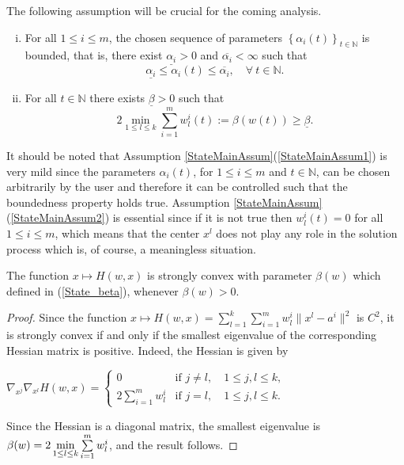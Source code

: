 The following assumption will be crucial for the coming analysis.
\begin{assumption}\label{StateMainAssum}
\begin{enumerate}[(i)] 
	\item For all $1 \leq i \leq m$, the chosen sequence of parameters $\left\lbrace \alpha_i(t) \right\rbrace_{t \in \mathbb{N}}$ is bounded, that is, there exist $\underline{\alpha_i} > 0$ and $\overline{\alpha_i} < \infty$ such that
		\begin{equation}
			\underline{\alpha_i} \leq \alpha_i(t) \leq \overline{\alpha_i}, \quad \forall \: t \in \mathbb{N}.
		\end{equation}		 \label{StateMainAssum1}
	\item For all $t \in \mathbb{N}$ there exists $\underline{\beta} > 0$ such that
		\begin{equation}
			2 \min\limits_{1 \leq l \leq k} \sum\limits_{i=1}^{m} w^i_l(t) := \beta(w(t)) \geq \underline{\beta}. \label{State_beta}
		\end{equation}		 \label{StateMainAssum2}
\end{enumerate}
\end{assumption}
It should be noted that Assumption \ref{StateMainAssum}(\ref{StateMainAssum1}) is very mild since the parameters $\alpha_i(t)$, for $1 \leq i \leq m$ and $t \in \mathbb{N}$, can be chosen arbitrarily by the user and therefore it can be controlled such that the boundedness property holds true. Assumption \ref{StateMainAssum}(\ref{StateMainAssum2}) is essential since if it is not true then $w^i_l(t)=0$ for all $1 \leq i \leq m$, which means that the center $x^l$ does not play any role in the solution process which is, of course, a meaningless situation.

\begin{lemma} \label{StateEq14}
The function $x \mapsto H(w,x)$ is strongly convex with parameter $\beta(w)$ which defined in (\ref{State_beta}), whenever $\beta(w) > 0$.
\end{lemma}

\begin{proof}
Since the function $x \mapsto H(w,x) = 
\sum\limits_{l=1}^{k} \sum\limits_{i=1}^{m} w^i_l \|x^l - a^i\|^2$ is $C^2$, it is strongly convex if and only if the smallest eigenvalue of the corresponding Hessian matrix is positive. Indeed, the Hessian is given by

\begin{center}
$\nabla_{x^j} \nabla_{x^l} H(w,x) = 
\begin{cases} 0 &\mbox{if } j \neq l, \quad 1 \leq j,l \leq k ,
\\ 2\sum\limits_{i=1}^{m} w^i_l &\mbox{if } j = l, \quad 1 \leq j,l \leq k. \end{cases} $
\end{center}

Since the Hessian is a diagonal matrix, the smallest eigenvalue is $\beta(w) = \\ 2\min\limits_{1 \leq l \leq k} \sum\limits_{i=1}^{m} w^i_l$, and the result follows.
\end{proof}

